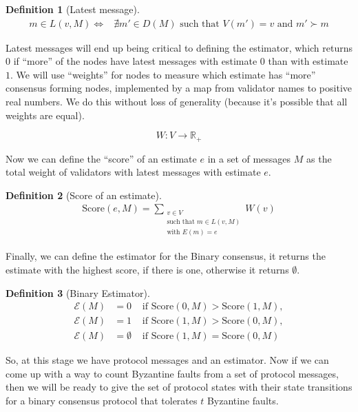 \documentclass{article}
\theoremstyle{definition}
\newtheorem{defn}{Definition}[section]
\begin{document}
\begin{defn}[Latest message]
\begin{equation*}
\begin{split}
m \in L(v, M) \iff & \nexists m' \in D(M) \text{ such that } V(m') = v \text{ and } m' \succ m
\end{split}
\end{equation*}
\end{defn}

Latest messages will end up being critical to defining the estimator, which returns $0$ if ``more'' of the nodes have latest messages with estimate $0$ than with estimate $1$. We will use ``weights'' for nodes to measure which estimate has ``more'' consensus forming nodes, implemented by a map from validator names to positive real numbers. We do this without loss of generality (because it's possible that all weights are equal).

$$
W:V \to \mathbb{R}_+
$$


Now we can define the ``score'' of an estimate $e$ in a set of messages $M$ as the total weight of validators with latest messages with estimate $e$.

\begin{defn}[Score of an estimate]
\begin{align}
\text{Score}(e, M) = \sum_{\substack{v \in V \\ \text{such that } m \in L(v,M) \\ \text{with } E(m) = e}} W(v)
\end{align}
\end{defn}

Finally, we can define the estimator for the Binary consensus, it returns the estimate with the highest score, if there is one, otherwise it returns $\emptyset$.

\begin{defn}[Binary Estimator]
\begin{align}
	\mathcal{E}(M) &= 0 &\text{ if } \text{Score}(0, M) > \text{Score}(1, M), \\
	\mathcal{E}(M) &= 1 &\text{ if } \text{Score}(1, M) > \text{Score}(0, M), \\
	\mathcal{E}(M) &= \emptyset &\text{ if } \text{Score}(1, M) = \text{Score}(0, M)
\end{align}
\end{defn}

So, at this stage we have protocol messages and an estimator. Now if we can come up with a way to count Byzantine faults from a set of protocol messages, then we will be ready to give the set of protocol states with their state transitions for a binary consensus protocol that tolerates $t$ Byzantine faults.
\end{document}
